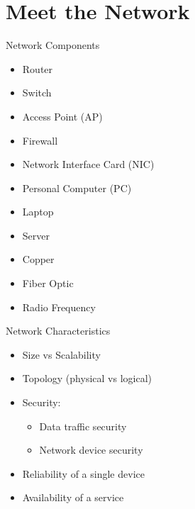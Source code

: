 \section[meet]{Meet the Network}

\begin{frame}{Network Components}
	\begin{itemize}[<2->]
		\item Router
		\item Switch
		\item Access Point (AP)
		\item Firewall
		\item Network Interface Card (NIC)
	\end{itemize}
	\begin{itemize}[<3->]
		\item Personal Computer (PC)
		\item Laptop
		\item Server
	\end{itemize}
	\begin{itemize}[<4->]
		\item Copper
		\item Fiber Optic
		\item Radio Frequency
	\end{itemize}
\end{frame}
\begin{frame}{Network Characteristics}
	\begin{itemize}[<+->]
		\item Size vs Scalability
		\item Topology (physical vs logical)
		\item Security:
		\begin{itemize}
			\item Data traffic security
			\item Network device security
		\end{itemize}
		\item Reliability of a single device
		\item Availability of a service
	\end{itemize}
\end{frame}

